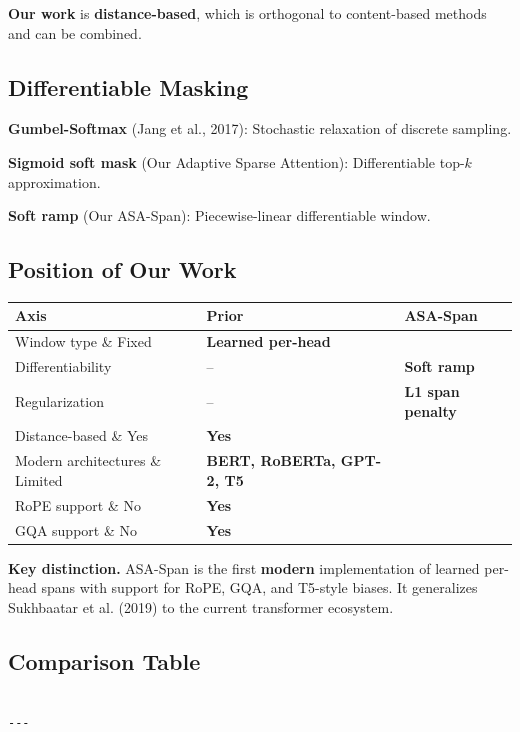 \textbf{Our work} is \textbf{distance-based}, which is orthogonal to content-based 
methods and can be combined.

\subsection{Differentiable Masking}

\textbf{Gumbel-Softmax} (Jang et al., 2017): Stochastic relaxation of discrete 
sampling.

\textbf{Sigmoid soft mask} (Our Adaptive Sparse Attention): Differentiable 
top-$k$ approximation.

\textbf{Soft ramp} (Our ASA-Span): Piecewise-linear differentiable window.

\subsection{Position of Our Work}

\begin{table}[H]
\centering
\small
\begin{tabular}{lll}
\toprule
\textbf{Axis} & \textbf{Prior} & \textbf{ASA-Span} \\
\midrule
Window type \& Fixed & \textbf{Learned per-head} \\
Differentiability & -- & \textbf{Soft ramp} \\
Regularization & -- & \textbf{L1 span penalty} \\
Distance-based \& Yes & \textbf{Yes} \\
Modern architectures \& Limited & \textbf{BERT, RoBERTa, GPT-2, T5} \\
RoPE support \& No & \textbf{Yes} \\
GQA support \& No & \textbf{Yes} \\
\bottomrule
\end{tabular}
\end{table}

\textbf{Key distinction.} ASA-Span is the first \textbf{modern} implementation of 
learned per-head spans with support for RoPE, GQA, and T5-style biases. It 
generalizes Sukhbaatar et al. (2019) to the current transformer ecosystem.

\subsection{Comparison Table}

\begin{lstlisting}

---
\end{lstlisting}